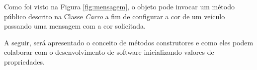 Como foi visto na Figura \ref{fig:mensagem}, o objeto pode invocar um método
público descrito na Classe \textit{Carro} a fim de configurar a cor de um
veículo passando uma mensagem com a cor solicitada.

A seguir, será apresentado o conceito de métodos construtores e como eles podem
colaborar com o desenvolvimento de software inicializando valores de
propriedades.

